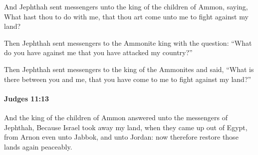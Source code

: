 			\begin{versebox}
					\item[BHS] 
					\item[ASV] And Jephthah sent messengers unto the king of the children of Ammon, saying, What hast thou to do with me, that thou art come unto me to fight against my land?
					\item[NIV] Then Jephthah sent messengers to the Ammonite king with the question: “What do you have against me that you have attacked my country?”
					\item[NRSV] Then Jephthah sent messengers to the king of the Ammonites and said, “What is there between you and me, that you have come to me to fight against my land?”
			\end{versebox}

		\paragraph{Judges 11:13} %
			\label{JUDGES-11-13}

			And the king of the children of Ammon answered unto the messengers of Jephthah, Because Israel took away my land, when they came up out of Egypt, from Arnon even unto Jabbok, and unto Jordan: now therefore restore those lands again peaceably.

